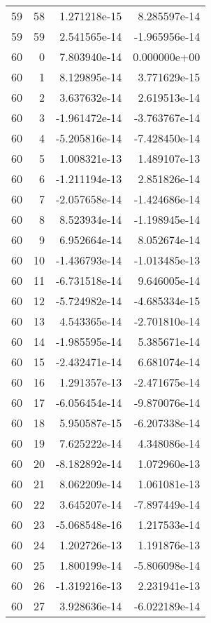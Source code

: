\begin{tabular}{rrrr}
  59 &   58 &  1.271218e-15 &  8.285597e-14 \\
  59 &   59 &  2.541565e-14 & -1.965956e-14 \\
  60 &    0 &  7.803940e-14 &  0.000000e+00 \\
  60 &    1 &  8.129895e-14 &  3.771629e-15 \\
  60 &    2 &  3.637632e-14 &  2.619513e-14 \\
  60 &    3 & -1.961472e-14 & -3.763767e-14 \\
  60 &    4 & -5.205816e-14 & -7.428450e-14 \\
  60 &    5 &  1.008321e-13 &  1.489107e-13 \\
  60 &    6 & -1.211194e-13 &  2.851826e-14 \\
  60 &    7 & -2.057658e-14 & -1.424686e-14 \\
  60 &    8 &  8.523934e-14 & -1.198945e-14 \\
  60 &    9 &  6.952664e-14 &  8.052674e-14 \\
  60 &   10 & -1.436793e-14 & -1.013485e-13 \\
  60 &   11 & -6.731518e-14 &  9.646005e-14 \\
  60 &   12 & -5.724982e-14 & -4.685334e-15 \\
  60 &   13 &  4.543365e-14 & -2.701810e-14 \\
  60 &   14 & -1.985595e-14 &  5.385671e-14 \\
  60 &   15 & -2.432471e-14 &  6.681074e-14 \\
  60 &   16 &  1.291357e-13 & -2.471675e-14 \\
  60 &   17 & -6.056454e-14 & -9.870076e-14 \\
  60 &   18 &  5.950587e-15 & -6.207338e-14 \\
  60 &   19 &  7.625222e-14 &  4.348086e-14 \\
  60 &   20 & -8.182892e-14 &  1.072960e-13 \\
  60 &   21 &  8.062209e-14 &  1.061081e-13 \\
  60 &   22 &  3.645207e-14 & -7.897449e-14 \\
  60 &   23 & -5.068548e-16 &  1.217533e-14 \\
  60 &   24 &  1.202726e-13 &  1.191876e-13 \\
  60 &   25 &  1.800199e-14 & -5.806098e-14 \\
  60 &   26 & -1.319216e-13 &  2.231941e-13 \\
  60 &   27 &  3.928636e-14 & -6.022189e-14 \\

\end{tabular}
